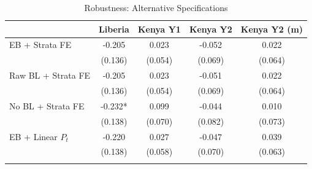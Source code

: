 \begin{table}[htbp]
\centering
\small
\caption{Robustness: Alternative Specifications}
\label{tab:robustness}
\begin{tabular}{l*{4}{c}}
\toprule
 & Liberia & Kenya Y1 & Kenya Y2 & Kenya Y2 (m) \\
\midrule
EB + Strata FE & -0.205 & 0.023 & -0.052 & 0.022 \\
 & (0.136) & (0.054) & (0.069) & (0.064) \\
\addlinespace
Raw BL + Strata FE & -0.205 & 0.023 & -0.051 & 0.022 \\
 & (0.136) & (0.054) & (0.069) & (0.064) \\
\addlinespace
No BL + Strata FE & -0.232* & 0.099 & -0.044 & 0.010 \\
 & (0.138) & (0.070) & (0.082) & (0.073) \\
\addlinespace
EB + Linear $P_t$ & -0.220 & 0.027 & -0.047 & 0.039 \\
 & (0.138) & (0.058) & (0.070) & (0.063) \\
\addlinespace
\bottomrule
\end{tabular}
\end{table}